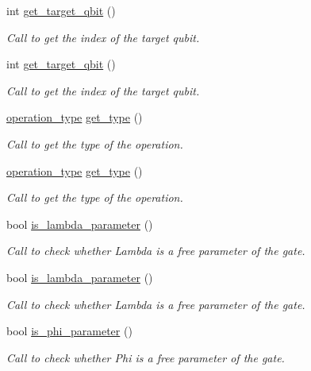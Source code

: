 \begin{DoxyCompactItemize}
int \hyperlink{class_operation_a55eee2ad4b90be085b1ec2ce018502f8}{get\+\_\+target\+\_\+qbit} ()
\begin{DoxyCompactList}\small\item\em Call to get the index of the target qubit. \end{DoxyCompactList}\item 
int \hyperlink{class_operation_a55eee2ad4b90be085b1ec2ce018502f8}{get\+\_\+target\+\_\+qbit} ()
\begin{DoxyCompactList}\small\item\em Call to get the index of the target qubit. \end{DoxyCompactList}\item 
\hyperlink{operations_2include_2_operation_8h_ad99e62941c8e4b13e5fc45ecaaf65eff}{operation\+\_\+type} \hyperlink{class_operation_acc601a7a00616fd6e2a61f61e084afac}{get\+\_\+type} ()
\begin{DoxyCompactList}\small\item\em Call to get the type of the operation. \end{DoxyCompactList}\item 
\hyperlink{operations_2include_2_operation_8h_ad99e62941c8e4b13e5fc45ecaaf65eff}{operation\+\_\+type} \hyperlink{class_operation_acc601a7a00616fd6e2a61f61e084afac}{get\+\_\+type} ()
\begin{DoxyCompactList}\small\item\em Call to get the type of the operation. \end{DoxyCompactList}\item 
bool \hyperlink{class_u3_ae2969dab2a542416fba0f26b9a330014}{is\+\_\+lambda\+\_\+parameter} ()
\begin{DoxyCompactList}\small\item\em Call to check whether Lambda is a free parameter of the gate. \end{DoxyCompactList}\item 
bool \hyperlink{class_u3_ae2969dab2a542416fba0f26b9a330014}{is\+\_\+lambda\+\_\+parameter} ()
\begin{DoxyCompactList}\small\item\em Call to check whether Lambda is a free parameter of the gate. \end{DoxyCompactList}\item 
bool \hyperlink{class_u3_acc83ff7e4a15c2445344e051410ddcc4}{is\+\_\+phi\+\_\+parameter} ()
\begin{DoxyCompactList}\small\item\em Call to check whether Phi is a free parameter of the gate. \end{DoxyCompactList}\item 

\end{DoxyCompactItemize}

